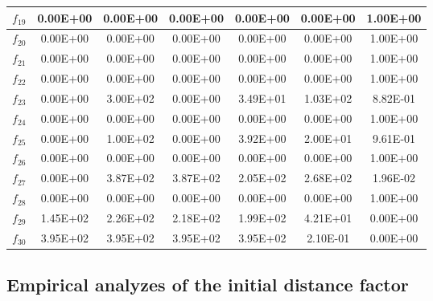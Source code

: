 \begin{table}[t]
\begin{scriptsize}
\begin{tabular}{|c|c|c|c|c|c|c|}
$f_{19}$ & 0.00E+00 & 0.00E+00 & 0.00E+00 & 0.00E+00 & 0.00E+00 & 1.00E+00 \\ \hline
$f_{20}$ & 0.00E+00 & 0.00E+00 & 0.00E+00 & 0.00E+00 & 0.00E+00 & 1.00E+00 \\ \hline
$f_{21}$ & 0.00E+00 & 0.00E+00 & 0.00E+00 & 0.00E+00 & 0.00E+00 & 1.00E+00 \\ \hline
$f_{22}$ & 0.00E+00 & 0.00E+00 & 0.00E+00 & 0.00E+00 & 0.00E+00 & 1.00E+00 \\ \hline
$f_{23}$ & 0.00E+00 & 3.00E+02 & 0.00E+00 & 3.49E+01 & 1.03E+02 & 8.82E-01 \\ \hline
$f_{24}$ & 0.00E+00 & 0.00E+00 & 0.00E+00 & 0.00E+00 & 0.00E+00 & 1.00E+00 \\ \hline
$f_{25}$ & 0.00E+00 & 1.00E+02 & 0.00E+00 & 3.92E+00 & 2.00E+01 & 9.61E-01 \\ \hline
$f_{26}$ & 0.00E+00 & 0.00E+00 & 0.00E+00 & 0.00E+00 & 0.00E+00 & 1.00E+00 \\ \hline
$f_{27}$ & 0.00E+00 & 3.87E+02 & 3.87E+02 & 2.05E+02 & 2.68E+02 & 1.96E-02 \\ \hline
$f_{28}$ & 0.00E+00 & 0.00E+00 & 0.00E+00 & 0.00E+00 & 0.00E+00 & 1.00E+00 \\ \hline
$f_{29}$ & 1.45E+02 & 2.26E+02 & 2.18E+02 & 1.99E+02 & 4.21E+01 & 0.00E+00 \\ \hline
$f_{30}$ & 3.95E+02 & 3.95E+02 & 3.95E+02 & 3.95E+02 & 2.10E-01 & 0.00E+00 \\ \hline
\end{tabular}%
\end{scriptsize}
\end{table}

\subsection{Empirical analyzes of the initial distance factor}

